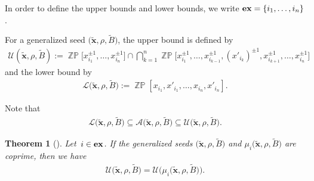 \documentclass[pdftex]{sigma}
\numberwithin{equation}{section}
\newtheorem{Theorem}{Theorem}[section]
\begin{document}
In order to define the upper bounds and lower bounds, we write ${\rm\mathbf{ex}}=\{i_1,\ldots,i_n\}$.
\begin{Definition}
For a generalized seed $\big(\widetilde{\mathbf{x}},\rho,\widetilde{B}\big)$, the upper bound is defined by
\begin{gather*}
\mathcal{U}(\widetilde{\mathbf{x}}, \rho, \widetilde{B}):= \mathop{\mathbb{ZP}}\!\big[x_{i_1}^{\pm1},\ldots,x_{i_n}^{\pm1}\big]\cap
\bigcap\limits_{k=1}^{n}\mathop{\mathbb{ZP}}\!\big[x_{i_1}^{\pm1},\ldots,x_{i_{k-1}}^{\pm1},(x'_{i_k})^{\pm1},x_{i_{k+1}}^{\pm1}, \ldots,x_{i_n}^{\pm1}\big]
\end{gather*}
and the lower bound by
\begin{gather*}
\mathcal{L}\big(\widetilde{\mathbf{x}},\rho,\widetilde{B}\big):= \mathop{\mathbb{ZP}}[x_{i_1},x'_{i_1},\ldots,x_{i_n},x'_{i_n}].
\end{gather*}
\end{Definition}

Note that
\begin{gather*}
 \mathcal{L}\big(\widetilde{\mathbf{x}},\rho,\widetilde{B}\big)\subseteq \mathcal{A}\big(\widetilde{\mathbf{x}},\rho,\widetilde{B}\big) \subseteq \mathcal{U}\big(\widetilde{\mathbf{x}},\rho,\widetilde{B}\big).
\end{gather*}

\begin{Theorem}[{\cite[Theorem 4.1]{gsv18}}]
Let~$i\in{\rm\mathbf{ex}}$. If the generalized seeds $\big(\widetilde{\mathbf{x}},\rho,\widetilde{B}\big)$ and $\mu_i\big(\widetilde{\mathbf{x}},\rho,\widetilde{B}\big)$ are coprime, then we have
\begin{gather*}
\mathcal{U}\big(\widetilde{\mathbf{x}},\rho,\widetilde{B}\big) =\mathcal{U}\big(\mu_i\big(\widetilde{\mathbf{x}},\rho,\widetilde{B}\big)\big).
\end{gather*}
\end{Theorem}
\end{document}
